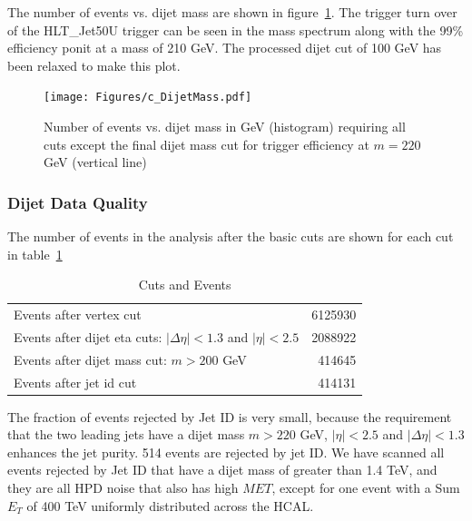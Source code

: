 The number of events vs. dijet mass are shown in figure~\ref{MassCut}.  The trigger turn over of the 
 HLT\_Jet50U trigger can be seen in the mass spectrum along with the 99\% efficiency ponit at 
 a mass of 210 GeV.  The processed dijet 
cut of 100 GeV has been relaxed to make this plot.

\begin{figure}[!ht]
  \begin{center}
    \texttt{[image: Figures/c\_DijetMass.pdf]}
   \caption{ Number of events vs. dijet mass in GeV (histogram) requiring all cuts except the final dijet mass cut for trigger
   efficiency at $m=220$ GeV (vertical line)}
    \label{MassCut}
  \end{center}
\end{figure}
\clearpage
\subsubsection{Dijet Data Quality}

The number of events in the analysis after the basic cuts are shown for
each cut in table~\ref{table:cuts}
\begin{table}[th]
  \centering
  \normalsize
  \begin{tabular}{|l|r|}
    \hline
      Events after vertex cut                              &  6125930\\
      Events after dijet eta cuts: $|\Delta\eta|<1.3$ and $|\eta|<2.5$ & 2088922 \\
      Events after dijet mass cut: $m>200$ GeV & 414645 \\
      Events after jet id cut                              &   414131 \\
    \hline
  \end{tabular}
  \caption{Cuts and Events}
  \label{table:cuts}
\end{table}

The fraction of events rejected by Jet ID is very small, because the requirement that the
two leading jets have a dijet mass $m>220$ GeV, $|\eta|<2.5$ and $|\Delta\eta|<1.3$ enhances the jet purity.
514 events are rejected by jet ID. We have scanned all events rejected by Jet ID that have a dijet
mass of greater than 1.4 TeV, and they are all HPD noise that also has high $MET$, except for one 
event with a Sum $E_T$ of 400 TeV uniformly distributed across the HCAL.



